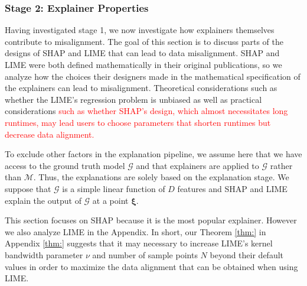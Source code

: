 \documentclass[mnsc,blindrev]{informs3}
\newcommand{\bI}{\mathbf{I}}
\begin{document}
   
    
   
    
 
   
    \subsubsection{Stage 2: Explainer Properties}
    \label{sec:theoretical_considerations}
   Having investigated stage 1, we now investigate how explainers themselves contribute to misalignment. The goal of this section is to discuss parts of the designs of SHAP and LIME that can lead to data misalignment. SHAP and LIME were both defined mathematically in their original publications, so we analyze how the choices their designers made in the mathematical specification of the explainers can lead to misalignment. Theoretical considerations such as whether the LIME's regression problem is unbiased as well as practical considerations \textcolor{red}{such as whether SHAP's design, which almost necessitates long runtimes, may lead users to choose parameters that shorten runtimes but decrease data alignment.}
   
   
   To exclude other factors in the explanation pipeline, we assume here that we have access to the ground truth model $\mathcal{G}$ and that explainers are applied to $\mathcal{G}$ rather than $\mathcal{M}$. Thus, the explanations are solely based on the explanation stage. We suppose that $\mathcal{G}$ is a simple linear function of $D$ features and SHAP and LIME explain the output of $\mathcal{G}$ at a point $\boldsymbol{\xi}$.%

  This section focuses on SHAP because it is the most popular explainer. However we also analyze LIME in the Appendix. In short, our Theorem \ref{thm:} in Appendix \ref{thm:} suggests that it may necessary to increase LIME's kernel bandwidth parameter $\nu$ and number of sample points $N$ beyond their default values in order to maximize the data alignment that can be obtained when using LIME. 
\end{document}
